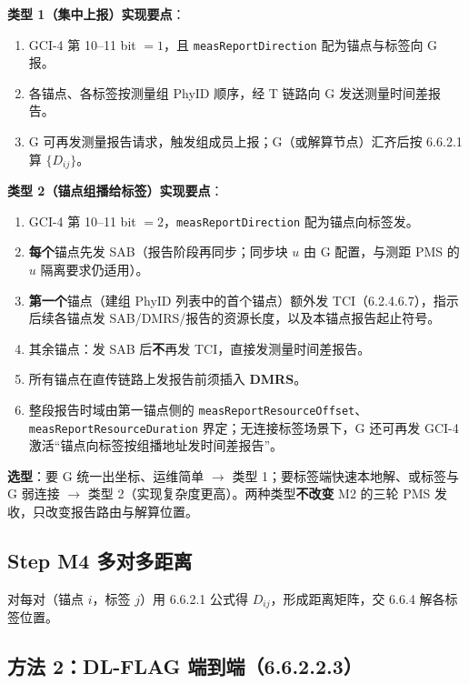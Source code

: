 \documentclass[11pt,a4paper]{ctexart}
\begin{document}
\textbf{类型 1（集中上报）实现要点}：
\begin{enumerate}[nosep]
  \item GCI-4 第 10--11 bit $=1$，且 \texttt{measReportDirection} 配为锚点与标签向 G 报。
  \item 各锚点、各标签按测量组 PhyID 顺序，经 T 链路向 G 发送测量时间差报告。
  \item G 可再发测量报告请求，触发组成员上报；G（或解算节点）汇齐后按 6.6.2.1 算 $\{D_{ij}\}$。
\end{enumerate}

\textbf{类型 2（锚点组播给标签）实现要点}：
\begin{enumerate}[nosep]
  \item GCI-4 第 10--11 bit $=2$，\texttt{measReportDirection} 配为锚点向标签发。
  \item \textbf{每个}锚点先发 SAB（报告阶段再同步；同步块 $u$ 由 G 配置，与测距 PMS 的 $u$ 隔离要求仍适用）。
  \item \textbf{第一个}锚点（建组 PhyID 列表中的首个锚点）额外发 TCI（6.2.4.6.7），指示后续各锚点发 SAB/DMRS/报告的资源长度，以及本锚点报告起止符号。
  \item 其余锚点：发 SAB 后\textbf{不}再发 TCI，直接发测量时间差报告。
  \item 所有锚点在直传链路上发报告前须插入 \textbf{DMRS}。
  \item 整段报告时域由第一锚点侧的 \texttt{measReportResourceOffset}、\texttt{measReportResourceDuration} 界定；无连接标签场景下，G 还可再发 GCI-4 激活``锚点向标签按组播地址发时间差报告''。
\end{enumerate}

\textbf{选型}：要 G 统一出坐标、运维简单 $\rightarrow$ 类型 1；要标签端快速本地解、或标签与 G 弱连接 $\rightarrow$ 类型 2（实现复杂度更高）。两种类型\textbf{不改变} M2 的三轮 PMS 发收，只改变报告路由与解算位置。

\subsection{Step M4 多对多距离}

对每对（锚点 $i$，标签 $j$）用 6.6.2.1 公式得 $D_{ij}$，形成距离矩阵，交 6.6.4 解各标签位置。

\subsection{方法 2：DL-FLAG 端到端（6.6.2.2.3）}
\end{document}
